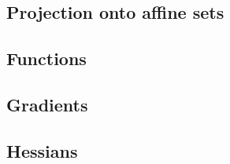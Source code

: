 \subsection{Projection onto affine sets}
\subsection{Functions}
\subsection{Gradients}
\subsection{Hessians}